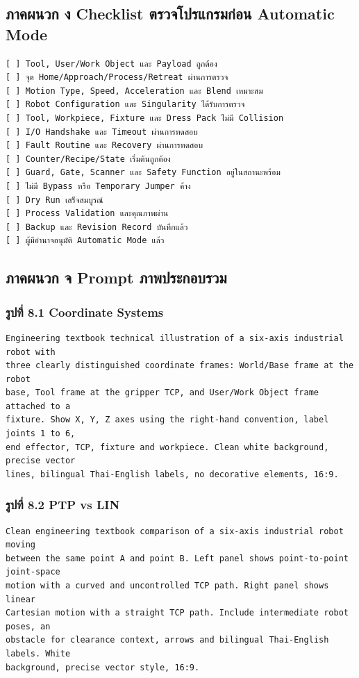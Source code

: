 \subsection{ภาคผนวก ง Checklist ตรวจโปรแกรมก่อน Automatic Mode}

\begin{verbatim}
[ ] Tool, User/Work Object และ Payload ถูกต้อง
[ ] จุด Home/Approach/Process/Retreat ผ่านการตรวจ
[ ] Motion Type, Speed, Acceleration และ Blend เหมาะสม
[ ] Robot Configuration และ Singularity ได้รับการตรวจ
[ ] Tool, Workpiece, Fixture และ Dress Pack ไม่มี Collision
[ ] I/O Handshake และ Timeout ผ่านการทดสอบ
[ ] Fault Routine และ Recovery ผ่านการทดสอบ
[ ] Counter/Recipe/State เริ่มต้นถูกต้อง
[ ] Guard, Gate, Scanner และ Safety Function อยู่ในสถานะพร้อม
[ ] ไม่มี Bypass หรือ Temporary Jumper ค้าง
[ ] Dry Run เสร็จสมบูรณ์
[ ] Process Validation และคุณภาพผ่าน
[ ] Backup และ Revision Record บันทึกแล้ว
[ ] ผู้มีอำนาจอนุมัติ Automatic Mode แล้ว
\end{verbatim}



\subsection{ภาคผนวก จ Prompt ภาพประกอบรวม}

\subsubsection{รูปที่ 8.1 Coordinate Systems}

\begin{verbatim}
Engineering textbook technical illustration of a six-axis industrial robot with
three clearly distinguished coordinate frames: World/Base frame at the robot
base, Tool frame at the gripper TCP, and User/Work Object frame attached to a
fixture. Show X, Y, Z axes using the right-hand convention, label joints 1 to 6,
end effector, TCP, fixture and workpiece. Clean white background, precise vector
lines, bilingual Thai-English labels, no decorative elements, 16:9.
\end{verbatim}

\subsubsection{รูปที่ 8.2 PTP vs LIN}

\begin{verbatim}
Clean engineering textbook comparison of a six-axis industrial robot moving
between the same point A and point B. Left panel shows point-to-point joint-space
motion with a curved and uncontrolled TCP path. Right panel shows linear
Cartesian motion with a straight TCP path. Include intermediate robot poses, an
obstacle for clearance context, arrows and bilingual Thai-English labels. White
background, precise vector style, 16:9.
\end{verbatim}

